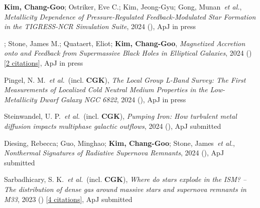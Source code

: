 \item \textbf{Kim, Chang-Goo}; Ostriker, Eve C.; Kim, Jeong-Gyu; Gong, Munan~\textit{et al.}, \textit{Metallicity Dependence of Pressure-Regulated Feedback-Modulated Star Formation in the TIGRESS-NCR Simulation Suite}, 2024 (), ApJ in press

\item {}; Stone, James M.; Quataert, Eliot; \textbf{Kim, Chang-Goo}, \textit{Magnetized Accretion onto and Feedback from Supermassive Black Holes in Elliptical Galaxies}, 2024 () [\href{http://adsabs.harvard.edu/abs/2024arXiv240511711G}{2 citations}], ApJ in press

\item Pingel, N. M.~\textit{et al.}~(incl. \textbf{CGK}), \textit{The Local Group L-Band Survey: The First Measurements of Localized Cold Neutral Medium Properties in the Low-Metallicity Dwarf Galaxy NGC 6822}, 2024 (), ApJ in press

\item Steinwandel, U. P.~\textit{et al.}~(incl. \textbf{CGK}), \textit{Pumping Iron: How turbulent metal diffusion impacts multiphase galactic outflows}, 2024 (), ApJ submitted

\item Diesing, Rebecca; Guo, Minghao; \textbf{Kim, Chang-Goo}; Stone, James~\textit{et al.}, \textit{Nonthermal Signatures of Radiative Supernova Remnants}, 2024 (), ApJ submitted

\item Sarbadhicary, S. K.~\textit{et al.}~(incl. \textbf{CGK}), \textit{Where do stars explode in the ISM? -- The distribution of dense gas around massive stars and supernova remnants in M33}, 2023 () [\href{http://adsabs.harvard.edu/abs/2023arXiv231017694S}{4 citations}], ApJ submitted